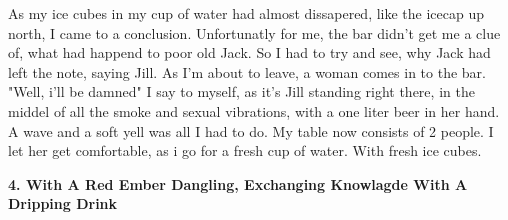 \documentclass[]{article}
\begin{document}
As my ice cubes in my cup of water had almost dissapered, like the icecap up north, I came to a conclusion. Unfortunatly for me, the bar didn't get me a clue of, what had happend to poor old Jack. So I had to try and see, why Jack had left the note, saying Jill. As I'm about to leave, a woman comes in to the bar. "Well, i'll be damned" I say to myself, as it's Jill standing right there, in the middel of all the smoke and sexual vibrations, with a one liter beer in her hand. A wave and a soft yell was all I had to do. My table now consists of 2 people. I let her get comfortable, as i go for a fresh cup of water. With fresh ice cubes.
\newpage

\begin{center}
	\large\textbf{4. With A Red Ember Dangling, \newline Exchanging Knowlagde With A Dripping Drink}
\end{center}
\end{document}
